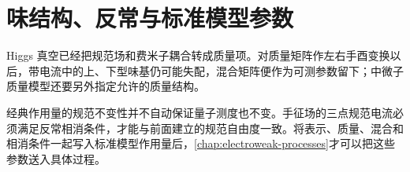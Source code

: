\chapter{味结构、反常与标准模型参数}\label{chap:flavor-and-anomalies}

Higgs 真空已经把规范场和费米子耦合转成质量项。对质量矩阵作左右手酉变换以后，带电流中的上、下型味基仍可能失配，混合矩阵便作为可测参数留下；中微子质量模型还要另外指定允许的质量结构。

经典作用量的规范不变性并不自动保证量子测度也不变。手征场的三点规范电流必须满足反常相消条件，才能与前面建立的规范自由度一致。将表示、质量、混合和相消条件一起写入标准模型作用量后，\cref{chap:electroweak-processes}才可以把这些参数送入具体过程。





